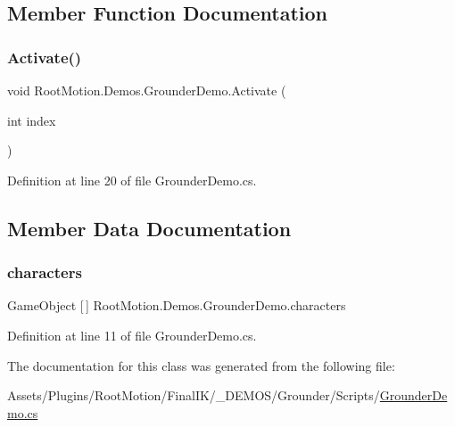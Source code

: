 \subsection{Member Function Documentation}
\mbox{\label{class_root_motion_1_1_demos_1_1_grounder_demo_a4312958bfc47e6dfc497d03e876e1e10}} 
\subsubsection{\texorpdfstring{Activate()}{Activate()}}
{\footnotesize\ttfamily void Root\+Motion.\+Demos.\+Grounder\+Demo.\+Activate (\begin{DoxyParamCaption}\item[{int}]{index }\end{DoxyParamCaption})}



Definition at line 20 of file Grounder\+Demo.\+cs.



\subsection{Member Data Documentation}
\mbox{\label{class_root_motion_1_1_demos_1_1_grounder_demo_a8c9bed148bd1aa6dd6d494ccb064798d}} 
\subsubsection{\texorpdfstring{characters}{characters}}
{\footnotesize\ttfamily Game\+Object \mbox{[}$\,$\mbox{]} Root\+Motion.\+Demos.\+Grounder\+Demo.\+characters}



Definition at line 11 of file Grounder\+Demo.\+cs.



The documentation for this class was generated from the following file\+:\begin{DoxyCompactItemize}
\item 
Assets/\+Plugins/\+Root\+Motion/\+Final\+I\+K/\+\_\+\+D\+E\+M\+O\+S/\+Grounder/\+Scripts/\mbox{\hyperlink{_grounder_demo_8cs}{Grounder\+Demo.\+cs}}\end{DoxyCompactItemize}
